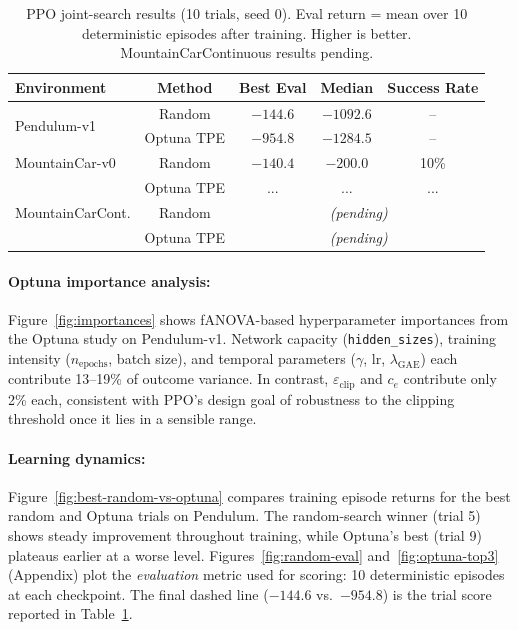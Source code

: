 \documentclass{article}
\begin{document}
\begin{table}[htbp]
  \centering
  \caption{PPO joint-search results (10 trials, seed 0). Eval return = mean over 10 deterministic episodes after training. Higher is better. MountainCarContinuous results pending.}
  \label{tab:ppo-joint-search}
  \small
  \begin{tabular}{lcccc}
    \toprule
    Environment & Method & Best Eval & Median & Success Rate \\
    \midrule
    \multirow{2}{*}{Pendulum-v1} 
      & Random & $\mathbf{-144.6}$ & $-1092.6$ & -- \\
      & Optuna TPE & $-954.8$ & $-1284.5$ & -- \\
    \midrule
    MountainCar-v0 & Random & $-140.4$ & $-200.0$ & 10\% \\
    & Optuna TPE & ... & ... & ... \\
    \midrule
    MountainCarCont. & Random & \multicolumn{3}{c}{\emph{(pending)}} \\
                     & Optuna TPE & \multicolumn{3}{c}{\emph{(pending)}} \\
    \bottomrule
  \end{tabular}
\end{table}

\paragraph{Optuna importance analysis:}
Figure~\ref{fig:importances} shows fANOVA-based hyperparameter importances from the Optuna study on Pendulum-v1. Network capacity (\texttt{hidden\_sizes}), training intensity ($n_{\mathrm{epochs}}$, batch size), and temporal parameters ($\gamma$, $\mathrm{lr}$, $\lambda_{\mathrm{GAE}}$) each contribute 13--19\% of outcome variance. In contrast, $\varepsilon_{\mathrm{clip}}$ and $c_e$ contribute only 2\% each, consistent with PPO's design goal of robustness to the clipping threshold once it lies in a sensible range.

\paragraph{Learning dynamics:}
Figure~\ref{fig:best-random-vs-optuna} compares training episode returns for the best random and Optuna trials on Pendulum. The random-search winner (trial 5) shows steady improvement throughout training, while Optuna's best (trial 9) plateaus earlier at a worse level. Figures~\ref{fig:random-eval} and~\ref{fig:optuna-top3} (Appendix) plot the \emph{evaluation} metric used for scoring: 10 deterministic episodes at each checkpoint. The final dashed line ($-144.6$ vs.\ $-954.8$) is the trial score reported in Table~\ref{tab:ppo-joint-search}.
\end{document}
